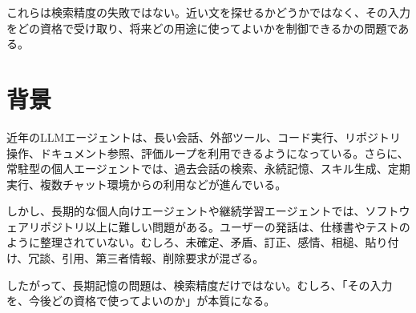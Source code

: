 \documentclass[12pt,a4paper]{article}
\begin{document}
\begin{center}
\end{center}

\begin{center}
\end{center}

これらは検索精度の失敗ではない。近い文を探せるかどうかではなく、その入力をどの資格で受け取り、将来どの用途に使ってよいかを制御できるかの問題である。

\section{背景}\label{ux80ccux666f}

近年のLLMエージェントは、長い会話、外部ツール、コード実行、リポジトリ操作、ドキュメント参照、評価ループを利用できるようになっている。さらに、常駐型の個人エージェントでは、過去会話の検索、永続記憶、スキル生成、定期実行、複数チャット環境からの利用などが進んでいる。

しかし、長期的な個人向けエージェントや継続学習エージェントでは、ソフトウェアリポジトリ以上に難しい問題がある。ユーザーの発話は、仕様書やテストのように整理されていない。むしろ、未確定、矛盾、訂正、感情、相槌、貼り付け、冗談、引用、第三者情報、削除要求が混ざる。

したがって、長期記憶の問題は、検索精度だけではない。むしろ、「その入力を、今後どの資格で使ってよいのか」が本質になる。
\end{document}
